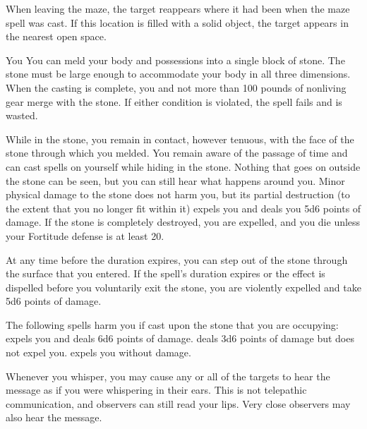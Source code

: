 When leaving the maze, the target reappears where it had been when the maze spell was cast. If this location is filled with a solid object, the target appears in the nearest open space.

\norepeatspellnotes

\spelldur{\durlong}
\begin{spelltarget}{You}
    \spelleffect You can meld your body and possessions into a single block of stone. The stone must be large enough to accommodate your body in all three dimensions. When the casting is complete, you and not more than 100 pounds of nonliving gear merge with the stone. If either condition is violated, the spell fails and is wasted.
    \par While in the stone, you remain in contact, however tenuous, with the face of the stone through which you melded. You remain aware of the passage of time and can cast spells on yourself while hiding in the stone. Nothing that goes on outside the stone can be seen, but you can still hear what happens around you. Minor physical damage to the stone does not harm you, but its partial destruction (to the extent that you no longer fit within it) expels you and deals you 5d6 points of damage. If the stone is completely destroyed, you are expelled, and you die unless your Fortitude defense is at least 20.
    \par At any time before the duration expires, you can step out of the stone through the surface that you entered. If the spell's duration expires or the effect is dispelled before you voluntarily exit the stone, you are violently expelled and take 5d6 points of damage.
\end{spelltarget}
\spellnotes The following spells harm you if cast upon the stone that you are occupying:  expels you and deals 6d6 points of damage.  deals 3d6 points of damage but does not expel you.  expels you without damage.

\spellrng{\rngmed}
\spelldur{\durlong}
\spellline
\spelleffect Whenever you whisper, you may cause any or all of the targets to hear the message as if you were whispering in their ears.
\spellnotes This is not telepathic communication, and observers can still read your lips. Very close observers may also hear the message.

